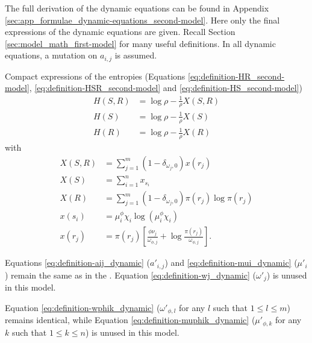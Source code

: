 The full derivation of the dynamic equations can be found in Appendix \ref{sec:app_formulae_dynamic-equations_second-model}.
Here only the final expressions of the dynamic equations are given. Recall Section \ref{sec:model_math_first-model} for many useful definitions. In all dynamic equations, a mutation on $a_{i,j}$ is assumed.

Compact expressions of the entropies (Equations \eqref{eq:definition-HR_second-model}, \eqref{eq:definition-HSR_second-model} and \eqref{eq:definition-HS_second-model})
\begin{align}
  \label{eq:definition-HSR_second-model_compact}
  H(S,R) &= \log \rho - \frac{1}{\rho} X(S,R) \\
  \label{eq:definition-HS_second-model_compact}
  H(S) &= \log \rho - \frac{1}{\rho} X(S) \\
  \label{eq:definition-HR_second-model_compact}
  H(R) &= \log \rho - \frac{1}{\rho} X(R)
\end{align}
with
\begin{align}
  \label{eq:definition-XSR_second-model}
  X(S,R) &= \sum_{j=1}^m (1 - \delta_{\omega_j,0}) x(r_j) \\
  \label{eq:definition-XS_second-model}
  X(S) &= \sum_{i=1}^n x_{s_i} \\
  \label{eq:definition-XR_second-model}
  X(R) &= \sum_{j=1}^m (1-\delta_{\omega_j,0}) \pi(r_j) \log \pi(r_j) \\
  \label{eq:definition-xsi_second-model}
  x(s_i) &= \mu_i^\phi \chi_i \log \left( \mu_i^\phi \chi_i \right) \\
  \label{eq:definition-xrj_second-model}
  x(r_j) &= \pi(r_j) \left[ \frac{\phi \nu_j}{\omega_{\phi,j}} + \log \frac{\pi(r_j)}{\omega_{\phi,j}} \right].
\end{align}

Equations \eqref{eq:definition-aij_dynamic} ($a'_{i,j}$) and \eqref{eq:definition-mui_dynamic} ($\mu'_i$) remain the same as in the \firstmodel{}.
Equation \eqref{eq:definition-wj_dynamic} ($\omega'_j$) is unused in this model.

Equation \eqref{eq:definition-wphik_dynamic} ($\omega'_{\phi,l}$ for any $l$ such that $1 \leq l \leq m$) remains identical, while Equation \eqref{eq:definition-muphik_dynamic} ($\mu'_{\phi,k}$ for any $k$ such that $1 \leq k \leq n$) is unused in this model.

